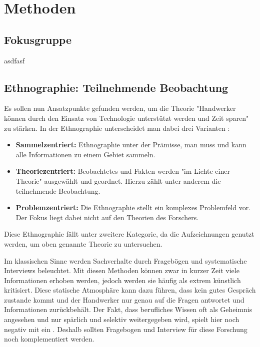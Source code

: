 \chapter{Methoden}

\section{Fokusgruppe}

asdfasf

\section{Ethnographie: Teilnehmende Beobachtung}

Es sollen nun Ansatzpunkte gefunden werden, um die Theorie "Handwerker können durch den Einsatz von Technologie unterstützt werden und Zeit sparen" zu stärken. In der Ethnographie unterscheidet man dabei drei Varianten \cite{spittler_teilnehmende_2001}:

\begin{itemize}
	\item \textbf{Sammelzentriert:} Ethnographie unter der Prämisse, man muss und kann alle Informationen zu einem Gebiet sammeln.
	\item \textbf{Theoriezentriert:} Beobachtetes und Fakten werden "im Lichte einer Theorie" ausgewählt und geordnet. Hierzu zählt unter anderem die teilnehmende Beobachtung.
	\item \textbf{Problemzentriert:} Die Ethnographie stellt ein komplexes Problemfeld vor. Der Fokus liegt dabei nicht auf den Theorien des Forschers.
\end{itemize}

Diese Ethnographie fällt unter zweitere Kategorie, da die Aufzeichnungen genutzt werden, um oben genannte Theorie zu untersuchen. 

Im klassischen Sinne werden Sachverhalte durch Fragebögen und systematische Interviews beleuchtet. Mit diesen Methoden können zwar in kurzer Zeit viele Informationen erhoben werden, jedoch werden sie häufig als extrem künstlich kritisiert. Diese statische Atmosphäre kann dazu führen, dass kein gutes Gespräch zustande kommt und der Handwerker nur genau auf die Fragen antwortet und Informationen zurückbehält. Der Fakt, dass berufliches Wissen oft als Geheimnis angesehen und nur spärlich und selektiv weitergegeben wird, spielt hier noch negativ mit ein \cite{spittler_teilnehmende_2001}. Deshalb sollten Fragebogen und Interview für diese Forschung noch komplementiert werden.

